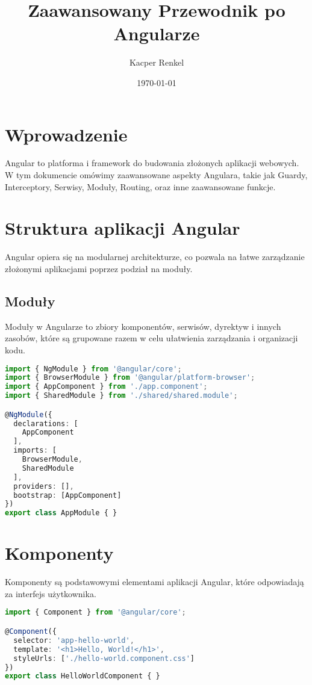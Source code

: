 \documentclass[a4paper,12pt]{article}
\title{Zaawansowany Przewodnik po Angularze}
\author{Kacper Renkel}
\date{\today}
\begin{document}
\maketitle

\tableofcontents
\newpage

\section{Wprowadzenie}
Angular to platforma i framework do budowania złożonych aplikacji webowych. W tym dokumencie omówimy zaawansowane aspekty Angulara, takie jak Guardy, Interceptory, Serwisy, Moduły, Routing, oraz inne zaawansowane funkcje.

\section{Struktura aplikacji Angular}
Angular opiera się na modularnej architekturze, co pozwala na łatwe zarządzanie złożonymi aplikacjami poprzez podział na moduły.

\subsection{Moduły}
Moduły w Angularze to zbiory komponentów, serwisów, dyrektyw i innych zasobów, które są grupowane razem w celu ułatwienia zarządzania i organizacji kodu.

\begin{lstlisting}[language=TypeScript, caption=Definicja modułu w Angularze]
import { NgModule } from '@angular/core';
import { BrowserModule } from '@angular/platform-browser';
import { AppComponent } from './app.component';
import { SharedModule } from './shared/shared.module';

@NgModule({
  declarations: [
    AppComponent
  ],
  imports: [
    BrowserModule,
    SharedModule
  ],
  providers: [],
  bootstrap: [AppComponent]
})
export class AppModule { }
\end{lstlisting}

\section{Komponenty}
Komponenty są podstawowymi elementami aplikacji Angular, które odpowiadają za interfejs użytkownika.

\begin{lstlisting}[language=TypeScript, caption=Przykładowy komponent]
import { Component } from '@angular/core';

@Component({
  selector: 'app-hello-world',
  template: '<h1>Hello, World!</h1>',
  styleUrls: ['./hello-world.component.css']
})
export class HelloWorldComponent { }
\end{lstlisting}
\end{document}
